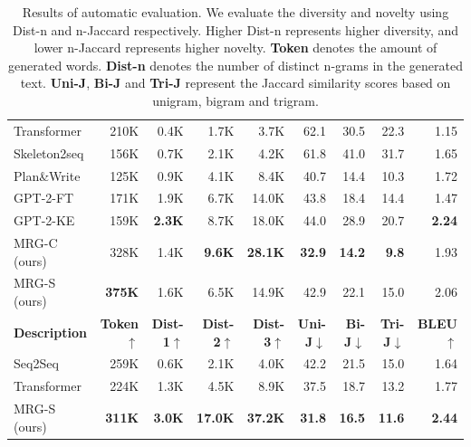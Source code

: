 \documentclass[letterpaper]{article} %
\begin{document}
\begin{table}[t]
{\begin{tabular}{lrrrrrrrr}
          Transformer & 210K & 0.4K & 1.7K & 3.7K & 62.1 & 30.5 & 22.3 & 1.15\\
          Skeleton2seq & 156K & 0.7K &  2.1K & 4.2K & 61.8 & 41.0 & 31.7 & 1.65\\
          Plan\&Write & 125K & 0.9K & 4.1K & 8.4K & 40.7 & 14.4 & 10.3 & 1.72\\
          GPT-2-FT  & 171K & 1.9K & 6.7K & 14.0K & 43.8 & 18.4 & 14.4  & 1.47\\
          GPT-2-KE  & 159K & \textbf{2.3K} & 8.7K & 18.0K & 44.0 & 28.9 & 20.7 & \textbf{2.24} \\ 
          \midrule
          MRG-C (ours) & 328K & 1.4K & \textbf{9.6K} & \textbf{28.1K}  & \textbf{32.9}  & \textbf{14.2} & \textbf{9.8} & 1.93 \\
          MRG-S (ours) & \textbf{375K} & 1.6K & 6.5K & 14.9K & 42.9 & 22.1 & 15.0 & 2.06  \\
          \midrule 
          \midrule 
          \textbf{Description} &
          \textbf{Token$\uparrow$} & 
          \textbf{Dist-1$\uparrow$} &
          \textbf{Dist-2$\uparrow$} & 
          \textbf{Dist-3$\uparrow$} &
          \textbf{Uni-J$\downarrow$}&
          \textbf{Bi-J$\downarrow$}&
          \textbf{Tri-J$\downarrow$}&
          \textbf{BLEU$\uparrow$}\\
          \midrule
          Seq2Seq   &  259K & 0.6K & 2.1K & 4.0K  &  42.2 & 21.5 & 15.0 & 1.64    \\
          Transformer & 224K & 1.3K & 4.5K & 8.9K & 37.5 & 18.7 & 13.2 & 1.77 \\
          \midrule
          MRG-S (ours) & \textbf{311K} & \textbf{3.0K} & \textbf{17.0K} & \textbf{37.2K}  &\textbf{31.8} & \textbf{16.5} & \textbf{11.6} & \textbf{2.44} \\ 
          \bottomrule %
  \end{tabular}}
  \caption{Results of automatic evaluation. We evaluate the diversity and novelty using Dist-n and n-Jaccard respectively. Higher Dist-n represents higher diversity, and lower n-Jaccard represents higher novelty. \textbf{Token} denotes the amount of generated words. \textbf{Dist-n} denotes the number of distinct n-grams in the generated text. \textbf{Uni-J}, \textbf{Bi-J} and \textbf{Tri-J} represent the Jaccard similarity scores based on unigram, bigram and trigram. }
\label{table:automatic}
\end{table} 
\end{document}
